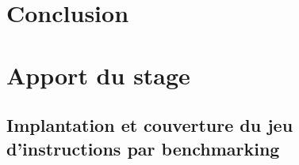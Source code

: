 \documentclass[a4paper,11pt]{article}
\begin{document}
\section{Conclusion}

\section{Apport du stage}


\begin{appendix}
\section{Implantation et couverture du jeu d'instructions par benchmarking}
 
\end{appendix}



\end{document}
